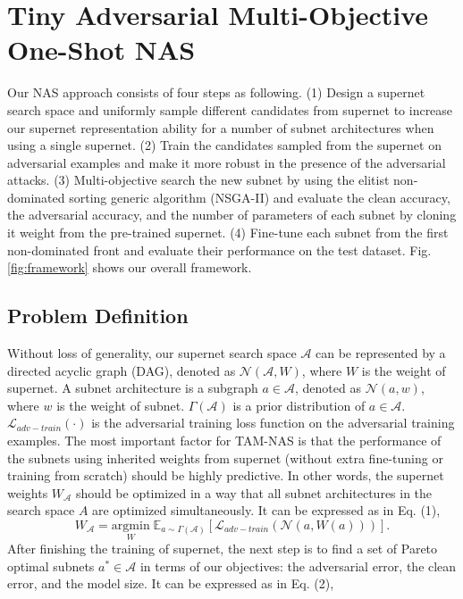 \documentclass[journal]{IEEEtran}
\begin{document}
\section{Tiny Adversarial Multi-Objective One-Shot NAS}

Our NAS approach consists of four steps as following. (1) Design a supernet search space and uniformly sample different candidates from supernet to increase our supernet representation ability for a number of subnet architectures when using a single supernet. (2) Train the candidates sampled from the supernet on adversarial examples and make it more robust in the presence of the adversarial attacks. (3) Multi-objective search the new subnet by using the elitist non-dominated sorting generic algorithm (NSGA-II) \cite{deb2002fast} and evaluate the clean accuracy, the adversarial accuracy, and the number of parameters of each subnet by cloning it weight from the pre-trained supernet. (4) Fine-tune each subnet from the first non-dominated front and evaluate their performance on the test dataset. Fig. \ref{fig:framework} shows our overall framework.

\subsection{\textbf{Problem Definition}}
Without loss of generality, our supernet search space $\mathcal{A}$ can be represented by a directed acyclic graph (DAG), denoted as $\mathcal{N}(\mathcal{A}, W)$, where $W$ is the weight of supernet. A subnet architecture is a subgraph $a \in \mathcal{A}$, denoted as $\mathcal{N}(a, w)$, where $w$ is the weight of subnet. $\Gamma(\mathcal{A})$ is a prior distribution of $a \in \mathcal{A}$. $\mathcal{L}_{adv-train}\left ( \cdot  \right )$ is the adversarial training loss function on the adversarial training examples. The most important factor for TAM-NAS is that the performance of the subnets using inherited weights from supernet (without extra fine-tuning or training from scratch) should be highly predictive. In other words, the supernet weights $W_{\mathcal{A}}$ should be optimized in a way that all subnet architectures in the search space $A$ are optimized simultaneously. It can be expressed as in Eq. (1), 
\begin{equation} \label{eq:supernet_definition}
    W_{\mathcal{A}} = \underset{W}{\mathrm{argmin}} \;\mathbb{E}_{a \sim \Gamma(\mathcal{A})}\left [\mathcal{L}_{adv-train}(\mathcal{N}(a, W(a)))  \right ].
\end{equation}
After finishing the training of supernet, the next step is to find a set of Pareto optimal subnets $a^{*} \in \mathcal{A}$ in terms of our objectives: the adversarial error, the clean error, and the model size. It can be expressed as in Eq. (2),
\end{document}
